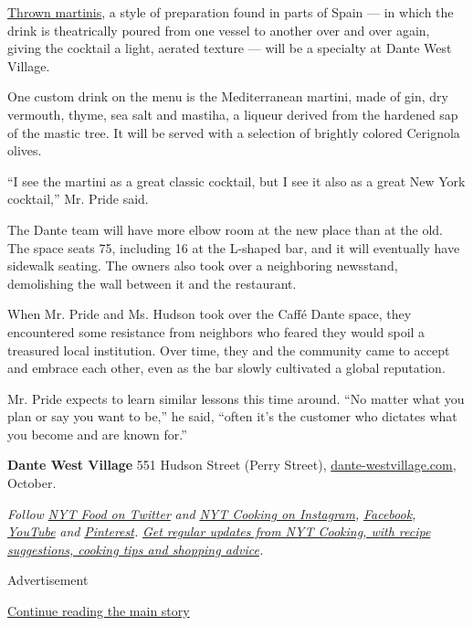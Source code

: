 \href{https://www.foodrepublic.com/2016/12/15/art-throwing-martinis/}{Thrown
martinis}, a style of preparation found in parts of Spain --- in which
the drink is theatrically poured from one vessel to another over and
over again, giving the cocktail a light, aerated texture --- will be a
specialty at Dante West Village.

One custom drink on the menu is the Mediterranean martini, made of gin,
dry vermouth, thyme, sea salt and mastiha, a liqueur derived from the
hardened sap of the mastic tree. It will be served with a selection of
brightly colored Cerignola olives.

``I see the martini as a great classic cocktail, but I see it also as a
great New York cocktail,'' Mr. Pride said.

The Dante team will have more elbow room at the new place than at the
old. The space seats 75, including 16 at the L-shaped bar, and it will
eventually have sidewalk seating. The owners also took over a
neighboring newsstand, demolishing the wall between it and the
restaurant.

When Mr. Pride and Ms. Hudson took over the Caffé Dante space, they
encountered some resistance from neighbors who feared they would spoil a
treasured local institution. Over time, they and the community came to
accept and embrace each other, even as the bar slowly cultivated a
global reputation.

Mr. Pride expects to learn similar lessons this time around. ``No matter
what you plan or say you want to be,'' he said, ``often it's the
customer who dictates what you become and are known for.''

\textbf{Dante West Village} 551 Hudson Street (Perry Street),
\href{https://www.dante-westvillage.com/}{dante-westvillage.}\href{https://www.dante-westvillage.com/}{com},
October.

\emph{Follow} \href{https://twitter.com/nytfood}{\emph{NYT Food on
Twitter}} \emph{and}
\href{https://www.instagram.com/nytcooking/}{\emph{NYT Cooking on
Instagram}}\emph{,}
\href{https://www.facebookcorewwwi.onion/nytcooking/}{\emph{Facebook}}\emph{,}
\href{https://www.youtube.com/nytcooking}{\emph{YouTube}} \emph{and}
\href{https://www.pinterest.com/nytcooking/}{\emph{Pinterest}}\emph{.}
\href{https://www.nytimes3xbfgragh.onion/newsletters/cooking}{\emph{Get
regular updates from NYT Cooking, with recipe suggestions, cooking tips
and shopping advice}}\emph{.}

Advertisement

\protect\hyperlink{after-bottom}{Continue reading the main story}

